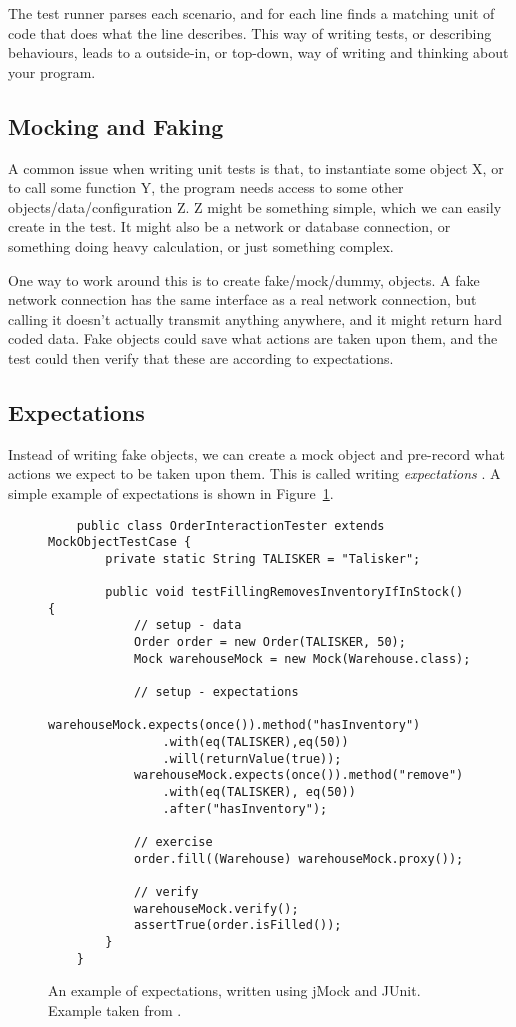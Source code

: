 \documentclass[a4paper,11pt]{kth-mag}
\begin{document}
The test runner parses each scenario, and for each line finds a matching unit
of code that does what the line describes. This way of writing tests, or
describing behaviours, leads to a outside-in, or top-down, way of writing and
thinking about your program.

\subsection{Mocking and Faking}

A common issue when writing unit tests is that, to instantiate some object X,
or to call some function Y, the program needs access to some other
objects/data/configuration Z. Z might be something simple, which we can easily
create in the test. It might also be a network or database connection, or
something doing heavy calculation, or just something complex.

One way to work around this is to create fake/mock/dummy, objects. A fake
network connection has the same interface as a real network connection, but
calling it doesn't actually transmit anything anywhere, and it might return
hard coded data. Fake objects could save what actions are taken upon them, and
the test could then verify that these are according to expectations.

\subsection{Expectations}

Instead of writing fake objects, we can create a mock object and pre-record
what actions we expect to be taken upon them. This is called writing
\textit{expectations} \cite{fowler07expectations}. A simple example of
expectations is shown in Figure~\ref{figure-expectations}.

\begin{figure}[h!]
	\lstset{language=Java}
	\begin{lstlisting}
	public class OrderInteractionTester extends MockObjectTestCase {
		private static String TALISKER = "Talisker";

		public void testFillingRemovesInventoryIfInStock() {
			// setup - data
			Order order = new Order(TALISKER, 50);
			Mock warehouseMock = new Mock(Warehouse.class);

			// setup - expectations
			warehouseMock.expects(once()).method("hasInventory")
				.with(eq(TALISKER),eq(50))
				.will(returnValue(true));
			warehouseMock.expects(once()).method("remove")
				.with(eq(TALISKER), eq(50))
				.after("hasInventory");

			// exercise
			order.fill((Warehouse) warehouseMock.proxy());

			// verify
			warehouseMock.verify();
			assertTrue(order.isFilled());
		}
	}
	\end{lstlisting}

	\caption{An example of expectations, written using jMock and JUnit.
	Example taken from \cite{fowler07expectations}.}
	\label{figure-expectations}
\end{figure}
\end{document}
